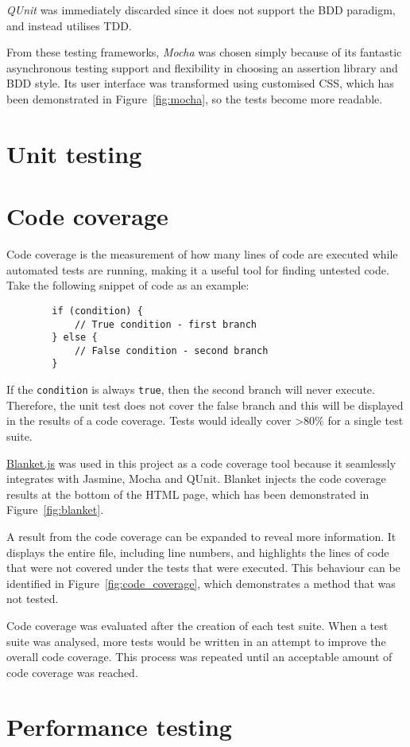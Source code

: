 {{		\emph{QUnit} was immediately discarded since it does not support the BDD paradigm, and instead utilises TDD.

		From these testing frameworks, \emph{Mocha} was chosen simply because of its fantastic asynchronous testing support and flexibility in choosing an assertion library and BDD style. Its user interface was transformed using customised CSS, which has been demonstrated in Figure~\ref{fig:mocha}, so the tests become more readable.

		

	}

}

\section{Unit testing} {



}

\section{Code coverage} {

	Code coverage is the measurement of how many lines of code are executed while automated tests are running, making it a useful tool for finding untested code. Take the following snippet of code as an example:

	\begin{lstlisting}
		if (condition) {
			// True condition - first branch
		} else {
			// False condition - second branch
		}
	\end{lstlisting}

	If the \texttt{condition} is always \texttt{true}, then the second branch will never execute. Therefore, the unit test does not cover the false branch and this will be displayed in the results of a code coverage. Tests would ideally cover \textgreater80\% for a single test suite.

	\href{http://blanketjs.org/}{Blanket.js} was used in this project as a code coverage tool because it seamlessly integrates with Jasmine, Mocha and QUnit. Blanket injects the code coverage results at the bottom of the HTML page, which has been demonstrated in Figure~\ref{fig:blanket}.

	

	A result from the code coverage can be expanded to reveal more information. It displays the entire file, including line numbers, and highlights the lines of code that were not covered under the tests that were executed. This behaviour can be identified in Figure~\ref{fig:code_coverage}, which demonstrates a method that was not tested.

	

	Code coverage was evaluated after the creation of each test suite. When a test suite was analysed, more tests would be written in an attempt to improve the overall code coverage. This process was repeated until an acceptable amount of code coverage was reached.

}

\section{Performance testing} {


}
